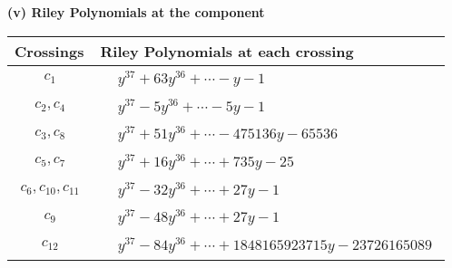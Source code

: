 \documentclass[1p]{elsarticle_modified}
\theoremstyle{definition}
\begin{document}
\flushleft \textbf{(v) Riley Polynomials at the component}\newline \\
\begin{tabular}{m{50pt}|m{274pt}}
Crossings & \hspace{64pt}Riley Polynomials at each crossing \\
\hline $$\begin{aligned}c_{1}\end{aligned}$$&$\begin{aligned}
&y^{37}+63 y^{36}+\cdots- y-1
\end{aligned}$\\
\hline $$\begin{aligned}c_{2},c_{4}\end{aligned}$$&$\begin{aligned}
&y^{37}-5 y^{36}+\cdots-5 y-1
\end{aligned}$\\
\hline $$\begin{aligned}c_{3},c_{8}\end{aligned}$$&$\begin{aligned}
&y^{37}+51 y^{36}+\cdots-475136 y-65536
\end{aligned}$\\
\hline $$\begin{aligned}c_{5},c_{7}\end{aligned}$$&$\begin{aligned}
&y^{37}+16 y^{36}+\cdots+735 y-25
\end{aligned}$\\
\hline $$\begin{aligned}c_{6},c_{10},c_{11}\end{aligned}$$&$\begin{aligned}
&y^{37}-32 y^{36}+\cdots+27 y-1
\end{aligned}$\\
\hline $$\begin{aligned}c_{9}\end{aligned}$$&$\begin{aligned}
&y^{37}-48 y^{36}+\cdots+27 y-1
\end{aligned}$\\
\hline $$\begin{aligned}c_{12}\end{aligned}$$&$\begin{aligned}
&y^{37}-84 y^{36}+\cdots+1848165923715 y-23726165089
\end{aligned}$\\
\hline
\end{tabular}\\~\\
\end{document}
